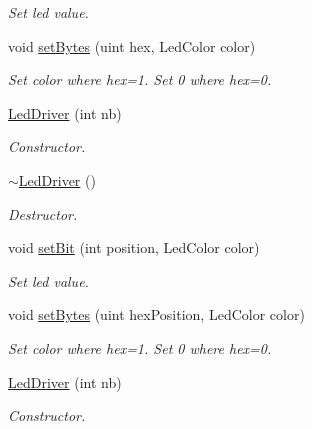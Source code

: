 \begin{DoxyCompactItemize}
\begin{DoxyCompactList}\small\item\em Set led value. \end{DoxyCompactList}\item 
void \hyperlink{classLedDriver_a66512dd673a81681d3597e301af13759}{set\+Bytes} (uint hex, Led\+Color color)
\begin{DoxyCompactList}\small\item\em Set color where hex=1. Set 0 where hex=0. \end{DoxyCompactList}\item 
\mbox{\label{classLedDriver_a23265705c54ed45e32b91ed9b2f4e0b6}} 
\hyperlink{classLedDriver_a23265705c54ed45e32b91ed9b2f4e0b6}{Led\+Driver} (int nb)
\begin{DoxyCompactList}\small\item\em Constructor. \end{DoxyCompactList}\item 
\mbox{\label{classLedDriver_a8b6afd79e2715068ff08c51a9df28065}} 
\hyperlink{classLedDriver_a8b6afd79e2715068ff08c51a9df28065}{$\sim$\+Led\+Driver} ()
\begin{DoxyCompactList}\small\item\em Destructor. \end{DoxyCompactList}\item 
void \hyperlink{classLedDriver_a1856fb030d88bcacdc37dfce7f0f8136}{set\+Bit} (int position, Led\+Color color)
\begin{DoxyCompactList}\small\item\em Set led value. \end{DoxyCompactList}\item 
void \hyperlink{classLedDriver_a765b8b642e13715ccaff1cbcff01dc97}{set\+Bytes} (uint hex\+Position, Led\+Color color)
\begin{DoxyCompactList}\small\item\em Set color where hex=1. Set 0 where hex=0. \end{DoxyCompactList}\item 
\mbox{\label{classLedDriver_a23265705c54ed45e32b91ed9b2f4e0b6}} 
\hyperlink{classLedDriver_a23265705c54ed45e32b91ed9b2f4e0b6}{Led\+Driver} (int nb)
\begin{DoxyCompactList}\small\item\em Constructor. \end{DoxyCompactList}\item 

\end{DoxyCompactItemize}
